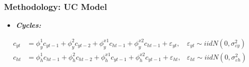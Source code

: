 \documentclass[10pt]{beamer}
\begin{document}
\begin{frame} 
	\frametitle{Methodology: UC Model}
		
	\begin{itemize}
		\item\textbf{\textit{Cycles:}}
	\end{itemize}

	\begin{align}
		c_{yt} &= \phi^1_{y}c_{yt-1}  
		+ \phi^2_{y}c_{yt-2}  
		+ \phi^{x1}_{y}c_{ht-1} 
		+ \phi^{x2}_{y}c_{ht-1} 
		+ \varepsilon_{yt},
		&\varepsilon_{yt} \sim iidN(0,\sigma^2_{\varepsilon y})		   
		\\
		c_{ht} &= \phi^1_{h}c_{ht-1}  
		+ \phi^2_{h}c_{ht-2}
		+ \phi^{x1}_{h}c_{yt-1}  
		+ \phi^{x2}_{h}c_{yt-1}  
		+ \varepsilon_{ht},
		&\varepsilon_{ht} \sim iidN(0,\sigma^2_{\varepsilon h})
	\end{align}
	
\end{frame}

\end{document}
